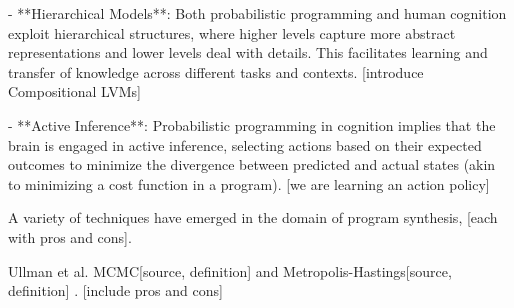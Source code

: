 - **Hierarchical Models**: Both probabilistic programming and human cognition exploit hierarchical structures, where higher levels capture more abstract representations and lower levels deal with details. This facilitates learning and transfer of knowledge across different tasks and contexts. [introduce Compositional LVMs]

- **Active Inference**: Probabilistic programming in cognition implies that the brain is engaged in active inference, selecting actions based on their expected outcomes to minimize the divergence between predicted and actual states (akin to minimizing a cost function in a program). [we are learning an action policy]












A variety of techniques have emerged in the domain of program synthesis, [each with pros and cons].

Ullman et al. MCMC[source, definition] and Metropolis-Hastings[source, definition] \cite{ullman_theory_2012}. [include pros and cons]






